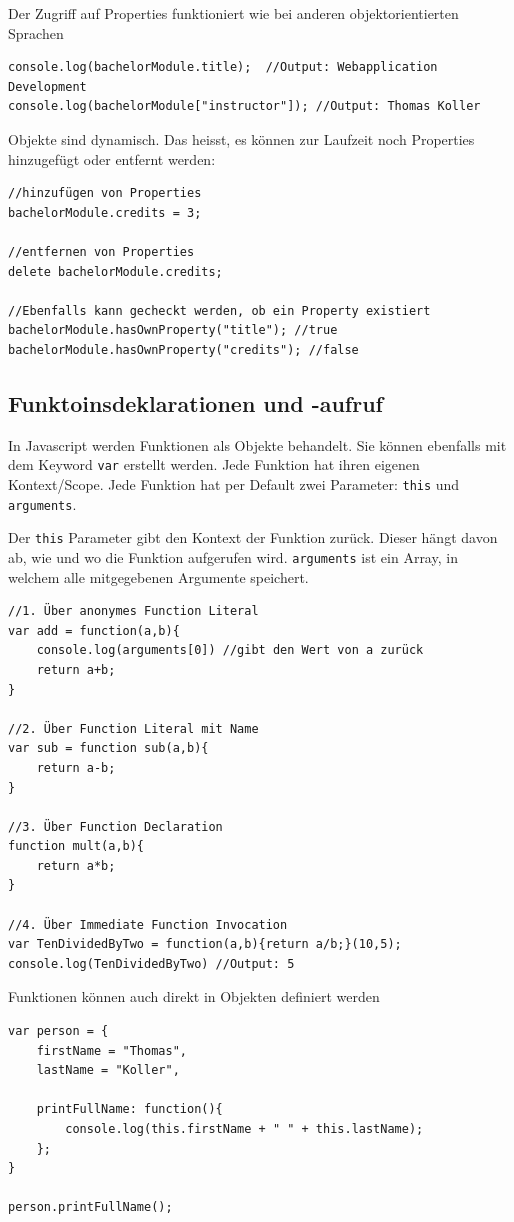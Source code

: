 \documentclass[a4paper, 11pt]{article}
\newcommand{\code}[1]{\texttt{#1}}
\begin{document}
Der Zugriff auf Properties funktioniert wie bei anderen objektorientierten Sprachen

\begin{lstlisting}
console.log(bachelorModule.title);  //Output: Webapplication Development
console.log(bachelorModule["instructor"]); //Output: Thomas Koller
\end{lstlisting}

Objekte sind dynamisch. Das heisst, es können zur Laufzeit noch Properties hinzugefügt oder entfernt werden:

\begin{lstlisting}
//hinzufügen von Properties
bachelorModule.credits = 3;

//entfernen von Properties
delete bachelorModule.credits;

//Ebenfalls kann gecheckt werden, ob ein Property existiert
bachelorModule.hasOwnProperty("title"); //true
bachelorModule.hasOwnProperty("credits"); //false
\end{lstlisting}
\subsection{Funktoinsdeklarationen und -aufruf}
In Javascript werden Funktionen als Objekte behandelt. Sie können ebenfalls mit dem Keyword \code{var} erstellt werden. Jede Funktion hat ihren eigenen Kontext/Scope. Jede Funktion hat per Default zwei Parameter: \code{this} und \code{arguments}.

Der \code{this} Parameter gibt den Kontext der Funktion zurück. Dieser hängt davon ab, wie und wo die Funktion aufgerufen wird. \code{arguments} ist ein Array, in welchem alle mitgegebenen Argumente speichert.

\begin{lstlisting}
//1. Über anonymes Function Literal
var add = function(a,b){
	console.log(arguments[0]) //gibt den Wert von a zurück
	return a+b;
}

//2. Über Function Literal mit Name
var sub = function sub(a,b){
	return a-b;
}

//3. Über Function Declaration
function mult(a,b){
	return a*b;
}

//4. Über Immediate Function Invocation
var TenDividedByTwo = function(a,b){return a/b;}(10,5);
console.log(TenDividedByTwo) //Output: 5
\end{lstlisting}

Funktionen können auch direkt in Objekten definiert werden
\begin{lstlisting}
var person = {
	firstName = "Thomas",
	lastName = "Koller",

	printFullName: function(){
		console.log(this.firstName + " " + this.lastName);
	};
}

person.printFullName();
\end{lstlisting}
\end{document}
